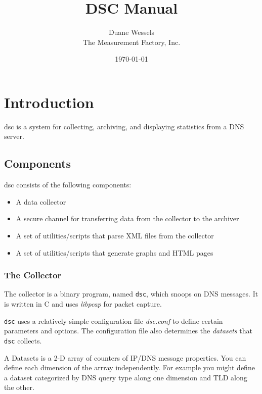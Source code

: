 \documentclass{report}
\def\dsc{{\sc dsc}}
\begin{document}
\begin{titlepage}
\title{DSC Manual}
\author{Duane Wessels\\
The Measurement Factory, Inc.}
\date{\today}
\end{titlepage}

\maketitle

\chapter{Introduction}

{\dsc} is a system for collecting, archiving, and displaying statistics from
a DNS server.  

\section{Components}

{\dsc} consists of the following components:
\begin{itemize}
\item A data collector
\item A secure channel for transferring data from the collector
	to the archiver
\item A set of utilities/scripts that parse XML files from the collector
\item A set of utilities/scripts that generate graphs and HTML pages
\end{itemize}

\subsection{The Collector}

The collector is a binary program, named {\tt dsc\/}, which snoops
on DNS messages.  It is written in C and uses {\em libpcap\/} for
packet capture.

{\tt dsc\/} uses a relatively simple configuration file {\em
dsc.conf\/} to define certain parameters and options.  The configuration
file also determines the {\em datasets\/} that {\tt dsc\/} collects.

A Datasets is a 2-D array of counters of IP/DNS message properties.
You can define each dimension of the arrray independently.  For
example you might define a dataset categorized by DNS query type
along one dimension and TLD along the other.
\end{document}
